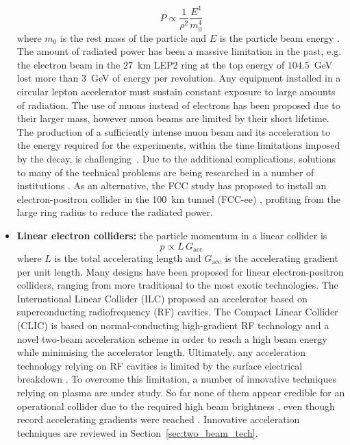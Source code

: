 \begin{itemize}
\begin{equation}
P\propto \frac{1}{\rho^2} \frac{E^4}{m_0^4}
\end{equation}
where $m_0$ is the rest mass of the particle and $E$ is the particle beam energy \cite{JAS:synchro-radiation, JOHNSON199723}. The amount of radiated power has been a massive limitation in the past, e.g. the electron beam in the 27~km LEP2 ring \cite{LEP2:cdr} at the top energy of $104.5$~GeV  lost more than $3$~GeV of energy per revolution. Any equipment installed in a circular lepton accelerator must sustain constant exposure to large amounts of radiation. The use of muons instead of electrons has been proposed due to their larger mass, however muon beams are limited by their short lifetime. The production of a sufficiently intense muon beam and its acceleration to the energy required for the experiments, within the time limitations imposed by the decay, is challenging~\cite{Rubbia:summary}. Due to the additional complications, solutions to many of the technical problems are being researched in a number of institutions \cite{Wang_2016, BONESINI2013203, Antonelli:2015nla}. As an alternative, the FCC study has proposed to install an electron-positron collider in the 100~km tunnel (FCC-ee) \cite{FCC-ee:cdr}, profiting from the large ring radius to reduce the radiated power.
\item \textbf{Linear electron colliders:} the particle momentum in a linear collider is $$p \propto L \, G_\text{acc}$$ where $L$ is the total accelerating length and $G_\text{acc}$ is the accelerating gradient per unit length. Many designs have been proposed for linear electron-positron colliders, ranging from more traditional to the most exotic technologies. The International Linear Collider (ILC) \cite{ILC:cdr} proposed an accelerator based on superconducting radiofrequency (RF) cavities. The Compact Linear Collider (CLIC) \cite{CLIC:cdr} is based on normal-conducting high-gradient RF technology and a novel two-beam acceleration scheme in order to reach a high beam energy while minimising the accelerator length. Ultimately, any acceleration technology relying on RF cavities is limited by the surface electrical breakdown \cite{KilpLimit}. To overcome this limitation, a  number of innovative techniques relying on plasma are under study. So far none of them appear credible for an operational collider due to the required high beam brightness \cite{doi:10.1142/S1793626816300097}, even though record accelerating gradients were reached \cite{Blumenfeld:2007ph}. Innovative acceleration techniques are reviewed in Section~\ref{sec:two_beam_tech}.
\end{itemize}


